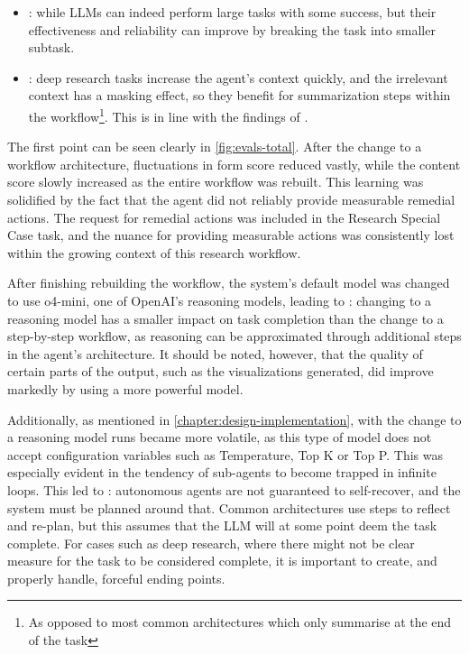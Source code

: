 \documentclass[a4paper]{report}
\begin{document}
\begin{itemize}
    \item {}\kfid : while LLMs can indeed perform large tasks with some success, but their effectiveness and reliability can improve by breaking the task into smaller subtask.
    \item {}\kfid : deep research tasks increase the agent's context quickly, and the irrelevant context has a masking effect, so they benefit for summarization steps within the workflow\footnote{As opposed to most common architectures which only summarise at the end of the task}. This is in line with the findings of \cite{veseli2025positionalbiasesshiftinputs}.
\end{itemize}

The first point can be seen clearly in \autoref{fig:evals-total}. After the change to a workflow architecture, fluctuations in form score reduced vastly, while the content score slowly increased as the entire workflow was rebuilt. This learning was solidified by the fact that the agent did not reliably provide measurable remedial actions. The request for remedial actions was included in the Research Special Case task, and the nuance for providing measurable actions was consistently lost within the growing context of this research workflow.

After finishing rebuilding the workflow, the system's default model was changed to use o4-mini, one of OpenAI's reasoning models, leading to \kfid : changing to a reasoning model has a smaller impact on task completion than the change to a step-by-step workflow, as reasoning can be approximated through additional steps in the agent's architecture. It should be noted, however, that the quality of certain parts of the output, such as the visualizations generated, did improve markedly by using a more powerful model.

Additionally, as mentioned in \autoref{chapter:design-implementation}, with the change to a reasoning model runs became more volatile, as this type of model does not accept configuration variables such as Temperature, Top K or Top P. This was especially evident in the tendency of sub-agents to become trapped in infinite loops. This led to \kfid : autonomous agents are not guaranteed to self-recover, and the system must be planned around that. Common architectures use steps to reflect and re-plan, but this assumes that the LLM will at some point deem the task complete. For cases such as deep research, where there might not be clear measure for the task to be considered complete, it is important to create, and properly handle, forceful ending points.
\end{document}
